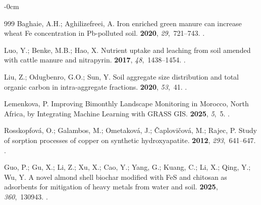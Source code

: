 \documentclass[environremediat,article,accept,pdftex,oneauthor]{Definitions/mdpi}
\begin{document}
\begin{adjustwidth}{-\extralength}{0cm}
\begin{thebibliography}{999}
Baghaie, A.H.; Aghilizefreei, A.
\newblock Iron enriched green manure can increase wheat Fe concentration in
  Pb-polluted soil.
 {\bf
  2020}, {\em 29},~721--743.
.

Luo, Y.; Benke, M.B.; Hao, X.
\newblock Nutrient uptake and leaching from soil amended with cattle manure and
  nitrapyrin.
 {\bf 2017},
  {\em 48},~1438--1454.
.

Liu, Z.; Odugbenro, G.O.; Sun, Y.
\newblock Soil aggregate size distribution and total organic carbon in
  intra-aggregate fractions.
 {\bf 2020}, {\em 53},~41.
.

Lemenkova, P. %
\newblock Improving Bimonthly Landscape Monitoring in Morocco, North Africa, by
  Integrating Machine Learning with GRASS GIS.
 {\bf 2025}, {\em 5},~5.
.

Rosskopfov{\'a}, O.; Galambos, M.; Ometakov{\'a}, J.;
  {\v{C}}aplovi{\v{c}}ov{\'a}, M.; Rajec, P.
\newblock Study of sorption processes of copper on synthetic hydroxyapatite.
 {\bf 2012},
  {\em 293},~641--647.
.

Guo, P.; Gu, X.; Li, Z.; Xu, X.; Cao, Y.; Yang, G.; Kuang, C.; Li, X.; Qing, Y.; Wu, Y.
\newblock A novel almond shell biochar modified with FeS and chitosan as
  adsorbents for mitigation of heavy metals from water and soil.
 {\bf 2025}, {\em
  360},~130943.
.


\end{thebibliography}
\end{adjustwidth}
\end{document}
